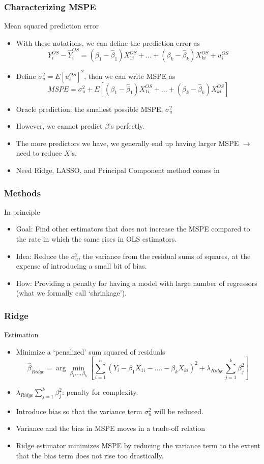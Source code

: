 \documentclass[compress]{beamer}
\begin{document}
\begin{frame}
\frametitle{Characterizing MSPE}
Mean squared prediction error
\begin{itemize}
\item With these notations, we can define the prediction error as
\[
Y_i^{OS}-\hat{Y}_i^{OS}=(\beta_1-\hat{\beta}_1)X^{OS}_{1i}+...+(\beta_k-\hat{\beta}_k)X^{OS}_{ki}+u_i^{OS}
\]
\item Define $\sigma_u^2=E[u_i^{OS}]^2$, then we can write MSPE as
\[
MSPE=\sigma_u^2+ E[(\beta_1-\hat{\beta}_1)X^{OS}_{1i}+...+(\beta_k-\hat{\beta}_k)X^{OS}_{ki}]
\]
\item Oracle prediction: the smallest possible MSPE, $\sigma_u^2$
\item However,  we cannot predict $\beta$'s perfectly.
\item The more predictors we have, we generally end up having larger MSPE $\to$ need to reduce $X$'s. 
\item Need Ridge, LASSO, and Principal Component method comes in

\end{itemize}
\end{frame}


\begin{frame}
\frametitle{Methods}
In principle
\begin{itemize}
\item Goal: Find other estimators that does not increase the MSPE compared to the rate in which the same rises in OLS estimators. 
\item Idea: Reduce the $\sigma_u^2$, the variance from the residual sums of squares, at the expense of introducing a small bit of bias. 
\item How: Providing a penalty for having a model with large number of regressors (what we formally call `shrinkage'). 
\end{itemize}
\end{frame}

\begin{frame}
\frametitle{Ridge}
Estimation
\begin{itemize}
\item Minimize a `penalized' sum squared of residuals
\[
\hat{\beta}_{Ridge}=\arg\min_{\beta_1,..,\beta_k}\left[ \sum_{i=1}^n(Y_i - \beta_1X_{1i}-....-\beta_kX_{ki})^2 + \lambda_{Ridge}\sum_{j=1}^k\beta_j^2\right]
\]
\item $\lambda_{Ridge}\sum_{j=1}^k\beta_j^2$: penalty for complexity. 
\item Introduce bias so that the variance term $\sigma_u^2$ will be reduced.
\item Variance and the bias in MSPE moves in a trade-off relation 
\item Ridge estimator minimizes MSPE by reducing the variance term to the extent that the bias term does not rise too drastically. 
\end{itemize}
\end{frame}
\end{document}
